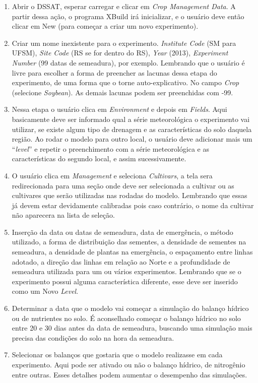 \documentclass[tg]{mdtufsm}
\begin{document}
	\begin{enumerate}
		\item  Abrir o DSSAT, esperar carregar e clicar em \emph{Crop Management Data}. A partir dessa ação, o programa XBuild irá inicializar, e o usuário deve então clicar em New (para começar a criar um novo experimento).
		\item  Criar um nome inexistente para o experimento. \emph{Institute Code} (SM para UFSM), \emph{Site Code} (RS se for dentro do RS), \emph{Year} (2013), \emph{Experiment Number} (99 datas de semeadura), por exemplo. Lembrando que o usuário é livre para escolher a forma de preencher as lacunas dessa etapa do experimento, de uma forma que o torne auto-explicativo. No campo \emph{Crop} (selecione \emph{Soybean}). As demais lacunas podem ser preenchidas com -99.
		\item Nessa etapa o usuário clica em \emph{Environment} e depois em \emph{Fields}. Aqui basicamente deve ser informado qual a série meteorológica o experimento vai utilizar, se existe algum tipo de drenagem e as características do solo daquela região. Ao rodar o modelo para outro local, o usuário deve adicionar mais um “\emph{level}” e repetir o preenchimento com a série meteorológica e as características do segundo local, e assim sucessivamente.  
		\item O usuário clica em \emph{Management} e seleciona \emph{Cultivars}, a tela sera redirecionada para uma seção onde deve ser selecionada a cultivar ou as cultivares que serão utilizadas nas rodadas do modelo. Lembrando que essas já devem estar devidamente calibradas pois caso contrário, o nome da cultivar não aparecera na lista de seleção.
		\item Inserção da data ou datas de semeadura, data de emergência, o método utilizado, a forma de distribuição das sementes, a densidade de sementes na semeadura, a densidade de plantas na emergência, o espaçamento entre linhas adotado, a direção das linhas em relação ao Norte e a profundidade de semeadura utilizada para um ou vários experimentos. Lembrando que se o experimento possui alguma característica diferente, esse deve ser inserido como um Novo \emph{Level}.
		\item Determinar a data que o modelo vai começar a simulação do balanço hídrico ou de nutrientes no solo. É aconselhado começar o balanço hídrico no solo entre 20 e 30 dias antes da data de semeadura, buscando uma simulação mais precisa das condições do solo na hora da semeadura.
		\item Selecionar os balanços que gostaria que o modelo realizasse em cada experimento. Aqui pode ser ativado ou não o balanço hídrico, de nitrogênio entre outras. Esses detalhes podem aumentar o desempenho das simulações.

\end{enumerate}
\end{document}
